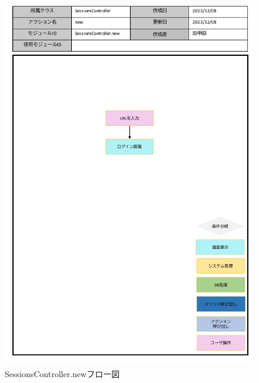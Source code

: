 \begin{figure}
    \centering
    \includegraphics[scale=0.7]{img/Sessions/pptx/SessionsController_new.pdf}
    \caption{SessionsController.newフロー図}
\end{figure}
